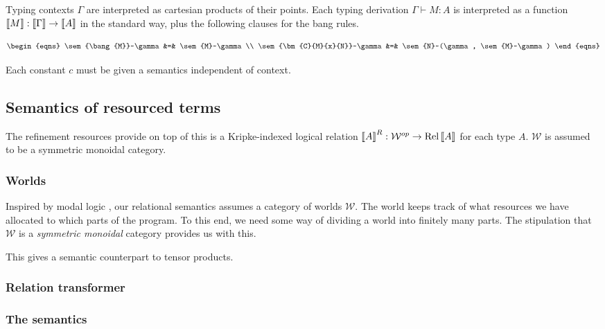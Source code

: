Typing contexts $\Gamma$ are interpreted as cartesian products of their points.
Each typing derivation $\Gamma \vdash M : A$ is interpreted as a function
$\left\llbracket M \right\rrbracket : \left\llbracket \Gamma \right\rrbracket \to \left\llbracket A \right\rrbracket$ in the standard way, plus the following
clauses for the bang rules.

\begin{displaymath}
  \begin{eqns}
    \sem{\bang{M}}~\gamma &=& \sem{M}~\gamma \\
    \sem{\bm{C}{M}{x}{N}}~\gamma &=& \sem{N}~(\gamma, \sem{M}~\gamma)
  \end{eqns}
\end{displaymath}

Each constant $c$ must be given a semantics independent of context.

\subsection{Semantics of resourced terms}

The refinement resources provide on top of this is a Kripke-indexed logical
relation $\left\llbracket A \right\rrbracket^R : \mathcal{W}^{op} \to \operatorname{Rel}\left\llbracket A \right\rrbracket$ for each type $A$.
$\mathcal{W}$ is assumed to be a symmetric monoidal category.

\subsubsection{Worlds}

Inspired by modal logic , our relational semantics assumes a category
of worlds $\mathcal W$.
The world keeps track of what resources we have allocated to which parts of the
program.
To this end, we need some way of dividing a world into finitely many parts.
The stipulation that $\mathcal W$ is a \emph{symmetric monoidal}
category provides us with this.

This gives a semantic counterpart to tensor products.


\subsubsection{Relation transformer}


\subsubsection{The semantics}

